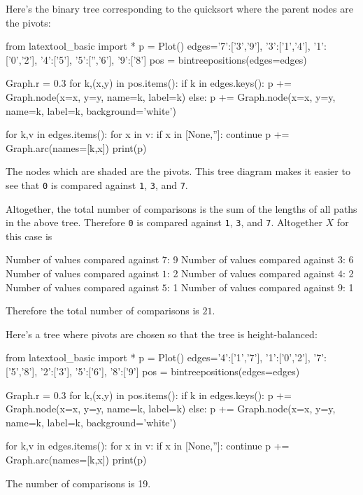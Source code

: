 Here's the binary tree corresponding to the quicksort where the parent nodes
are the pivots:
\begin{python}
from latextool_basic import *
p = Plot()
edges={'7':['3','9'],
 '3':['1','4'],
 '1':['0','2'],
 '4':['5'],
 '5':['','6'],
 '9':['8']}
pos = bintreepositions(edges=edges)

Graph.r = 0.3
for k,(x,y) in pos.items():
    if k in edges.keys():
        p += Graph.node(x=x, y=y, name=k, label=k)
    else:
        p += Graph.node(x=x, y=y, name=k, label=k, background='white')

for k,v in edges.items():
    for x in v:
        if x in [None,'']: continue
        p += Graph.arc(names=[k,x])
print(p)
\end{python}    
The nodes which are shaded are the pivots.
This tree diagram makes it easier to see that \verb!0!
is compared against \verb!1!, \verb!3!, and \verb!7!.

Altogether, the total number of comparisons is the sum of the lengths of all
paths in the above tree.
Therefore \verb!0! is compared against \verb!1!, \verb!3!, and \verb!7!.
Altogether $X$ for this case is
\begin{itemize}
  \li Number of values compared against $7$: 9
  \li Number of values compared against $3$: 6
  \li Number of values compared against $1$: 2
  \li Number of values compared against $4$: 2
  \li Number of values compared against $5$: 1
  \li Number of values compared against $9$: 1
\end{itemize}
Therefore the total number of comparisons is $21$.

Here's a tree where pivots are chosen so that the tree is height-balanced:
\begin{python}
from latextool_basic import *
p = Plot()
edges={'4':['1','7'],
 '1':['0','2'],
 '7':['5','8'],
 '2':['3'],
 '5':['6'],
 '8':['9']}
pos = bintreepositions(edges=edges)

Graph.r = 0.3
for k,(x,y) in pos.items():
    if k in edges.keys():
        p += Graph.node(x=x, y=y, name=k, label=k)
    else:
        p += Graph.node(x=x, y=y, name=k, label=k, background='white')

for k,v in edges.items():
    for x in v:
        if x in [None,'']: continue
        p += Graph.arc(names=[k,x])
print(p)
\end{python}
The number of comparisons is 19.



